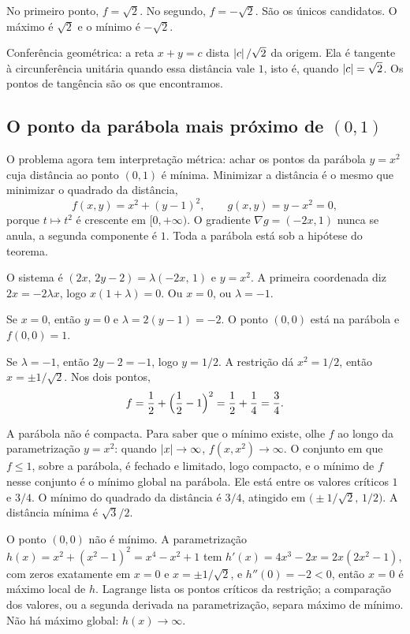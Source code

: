 \documentclass[11pt,a4paper]{article}
\begin{document}
No primeiro ponto, $f=\sqrt{2}$. No segundo, $f=-\sqrt{2}$. São os únicos candidatos. O máximo é $\sqrt{2}$ e o mínimo é $-\sqrt{2}$.

Conferência geométrica: a reta $x+y=c$ dista $\left\lvert c \right\rvert/\sqrt{2}$ da origem. Ela é tangente à circunferência unitária quando essa distância vale $1$, isto é, quando $\left\lvert c \right\rvert=\sqrt{2}$. Os pontos de tangência são os que encontramos.

\subsection{O ponto da parábola mais próximo de $(0,1)$}

O problema agora tem interpretação métrica: achar os pontos da parábola $y=x^2$ cuja distância ao ponto $(0,1)$ é mínima. Minimizar a distância é o mesmo que minimizar o quadrado da distância,
\[
f(x,y)=x^2+(y-1)^2,\qquad g(x,y)=y-x^2=0,
\]
porque $t\mapsto t^2$ é crescente em $[0,+\infty)$. O gradiente $\nabla g=(-2x,1)$ nunca se anula, a segunda componente é $1$. Toda a parábola está sob a hipótese do teorema.

O sistema é $(2x,\,2y-2)=\lambda(-2x,\,1)$ e $y=x^2$. A primeira coordenada diz $2x=-2\lambda x$, logo $x(1+\lambda)=0$. Ou $x=0$, ou $\lambda=-1$.

Se $x=0$, então $y=0$ e $\lambda=2(y-1)=-2$. O ponto $(0,0)$ está na parábola e $f(0,0)=1$.

Se $\lambda=-1$, então $2y-2=-1$, logo $y=1/2$. A restrição dá $x^2=1/2$, então $x=\pm 1/\sqrt{2}$. Nos dois pontos,
\[
f=\frac12+\Bigl(\frac12-1\Bigr)^2=\frac12+\frac14=\frac34.
\]

A parábola não é compacta. Para saber que o mínimo existe, olhe $f$ ao longo da parametrização $y=x^2$: quando $\left\lvert x \right\rvert\to\infty$, $f(x,x^2)\to\infty$. O conjunto em que $f\le 1$, sobre a parábola, é fechado e limitado, logo compacto, e o mínimo de $f$ nesse conjunto é o mínimo global na parábola. Ele está entre os valores críticos $1$ e $3/4$. O mínimo do quadrado da distância é $3/4$, atingido em $\bigl(\pm 1/\sqrt{2},\,1/2\bigr)$. A distância mínima é $\sqrt{3}/2$.

O ponto $(0,0)$ não é mínimo. A parametrização $h(x)=x^2+(x^2-1)^2=x^4-x^2+1$ tem $h'(x)=4x^3-2x=2x(2x^2-1)$, com zeros exatamente em $x=0$ e $x=\pm 1/\sqrt{2}$, e $h''(0)=-2<0$, então $x=0$ é máximo local de $h$. Lagrange lista os pontos críticos da restrição; a comparação dos valores, ou a segunda derivada na parametrização, separa máximo de mínimo. Não há máximo global: $h(x)\to\infty$.
\end{document}
